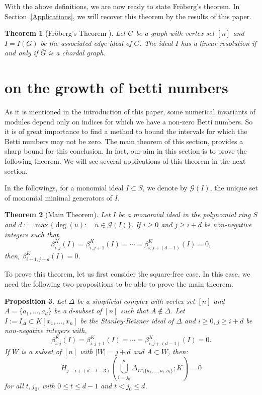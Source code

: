 \documentclass[a4paper,11pt]{amsart}
\theoremstyle{plain}
\newtheorem{thm}{Theorem}[section]
\newtheorem{prop}[thm]{Proposition}
\theoremstyle{definition}
\theoremstyle{remark}
\begin{document}
With the above definitions, we are now  ready to state Fr\"oberg's theorem. In Section~\ref{Applications}, we will recover this theorem by the results of this paper.

\begin{thm}[{Fr\"oberg's Theorem \cite{Froberg}}] \label{Froberg Theorem}
Let $G$ be a graph with vertex set $[n]$ and $I=I(G)$ be the associated edge ideal of $G$. The ideal $I$ has a linear resolution if and only if $\bar{G}$ is a chordal graph.
\end{thm}

\section{on the growth of betti numbers} \label{Section main Theorem}

As it is mentioned in the introduction of this paper, some numerical invariants of modules depend only on indices for which we have a non-zero Betti numbers. So it is of great importance to find a method to bound the intervals for which the Betti numbers may not be zero. The main theorem of this section, provides a sharp bound for this conclusion. In fact, our aim in this section is to prove the following theorem. We will see several applications of this theorem in the next section.

In the followings, for a monomial ideal $I \subset S$, we denote by $\mathcal{G} \left( I \right)$, the unique set of monomial minimal generators of $I$.
\begin{thm}[Main Theorem] \label{Growth of Beti numbers-Cor1}
Let $I$ be a monomial ideal in the polynomial ring $S$ and $d := \max \{ \deg (u) \colon \quad u \in \mathcal{G}(I) \}$. If $i\geq 0$ and $j \geq i+d$ be non-negative integers such that,
	$$\beta^K_{i,j}(I) = \beta^K_{i,j+1}(I) = \cdots = \beta^K_{i,j+(d-1)}(I) = 0,$$
then, $\beta^K_{i+1,j+d}(I) = 0$.
\end{thm}

To prove this theorem, let us first consider the square-free case. In this case, we need the following two propositions to be able to prove the main theorem.
\begin{prop} \label{Homology of equidimensional ideals}
	Let $\Delta$ be a simplicial complex with vertex set $[n]$ and $A=\{a_1, \ldots, a_d\}$ be a $d$-subset of $[n]$ such that $A \notin \Delta$. Let $I:=I_\Delta \subset K[x_1, \ldots, x_n]$ be the Stanley-Reisner ideal of $\Delta$ and $i \geq 0, j\geq i+d$ be non-negative integers with,
	$$\beta^K_{i,j}(I) = \beta^K_{i,j+1}(I) = \cdots = \beta^K_{i,j+(d-1)}(I) = 0.$$
	If $W$ is a subset of $[n]$ with $|W|=j+d$ and $A \subset W$, then:
	\begin{equation} \label{EQ Homology of Equidimensinal ideals}
	\tilde{H}_{j-i+(d-t-3)} \left( \bigcup\limits_{i={j_0}}^{d} \Delta_{W \setminus \{a_1, \ldots, a_t, a_i\}} ;K \right) =0
	\end{equation}
	for all $t, j_0$, with $0 \leq t \leq d-1$ and $t< j_0 \leq d$.
\end{prop}
\end{document}
